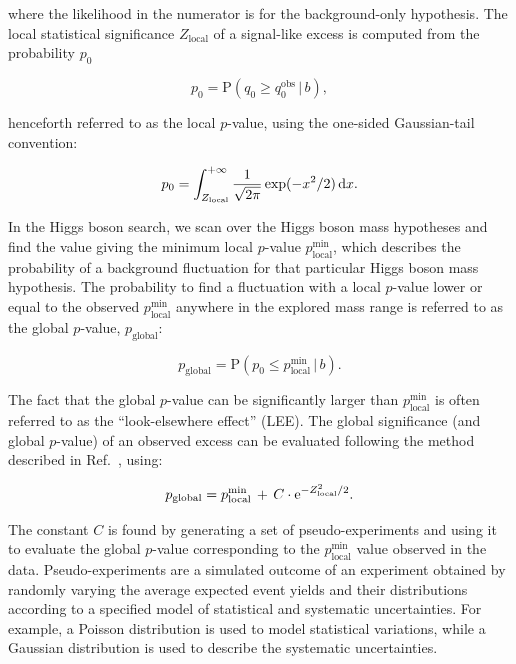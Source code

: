 \documentclass[12pt,twoside,a4paper,cmspaper,final,collab]{cms-tdr}
\begin{document}
where the likelihood in the numerator is for the background-only hypothesis.
The local statistical significance $Z_\text{local}$ of a signal-like excess is computed from the probability $p_0$

\begin{equation}
p_0 = \mathrm{P}(q_0 \geq q_0^\text{obs} \, | \, b),
\end{equation}

henceforth referred to as the local $p$-value, using the one-sided Gaussian-tail convention:

\begin{equation}
\label{eq:Z}
p_0 = \int_{Z_{\text{local}}}^{+\infty} \frac{1}{\sqrt{2\pi}} \exp(-x^2/2) \, \mathrm{d} x.
\end{equation}


In the Higgs boson search, we scan over the Higgs boson mass hypotheses and
find the value giving the minimum local $p$-value $p_{\text{local}}^{\text{min}}$,
which describes the probability of a background fluctuation for that particular Higgs boson mass
hypothesis. The probability to find a fluctuation with a local $p$-value lower or equal to the observed
$p_{\text{local}}^{\text{min}}$ anywhere in the explored mass range
is referred to as the global $p$-value, $p_{\text{global}}$:

\begin{equation}
p_{\mathrm{global}}= \mathrm{P}(p_0 \leq p_{\text{local}}^{\text{min}} \, | \, b).
\end{equation}

The fact that the global $p$-value can be significantly larger than $p_{\text{local}}^{\text{min}}$
is often referred to as the ``look-elsewhere effect'' (LEE).
The global significance (and global $p$-value) of an observed excess can be evaluated
following the method described in Ref.~\cite{LEE}, using:

\begin{equation}
\label{eq:LEE1}
p_{\text{global}}= p_{\text{local}}^{\text{min}} \, + \, C \cdot \mathrm{e}^{ - Z^2_{\text{local}} / 2 }.
\end{equation}

The constant $C$ is found by generating a set of pseudo-experiments and using it to
evaluate the global $p$-value corresponding to the $p_{\mathrm{local}}^{\mathrm{min}}$
value observed in the data. Pseudo-experiments are a simulated outcome of an experiment obtained by randomly varying the
average expected event yields and their distributions according to a specified model of statistical and
systematic uncertainties.
For example, a Poisson distribution is used to model statistical variations,
while a Gaussian distribution is used to describe the systematic uncertainties.
\end{document}
